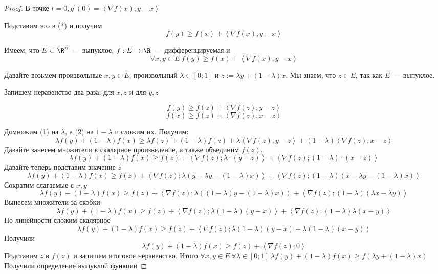 \begin{proof}
  В точке $t=0, g^{\prime}(0) = \left\langle \nabla f(x); y-x \right\rangle$

  Подставим это в (*) и получим
  \[
  f(y) \ge f(x) + \left\langle \nabla f(x); y-x \right\rangle
  \]

  \proofpart{$\Leftarrow$}
  Имеем, что $E \subset \R^n$~--- выпуклое, $f : E \rightarrow \R$~--- дифференцируемая и
  \[
  \forall x, y \in E\ f(y) \ge f(x) + \left\langle \nabla f(x); y-x \right\rangle
  \]

  Давайте возьмем произвольные $x,y \in E$, произвольный $\lambda \in [0;1]$  и $z:= \lambda y + (1-\lambda) x$. Мы знаем, что $z \in E$, так как $E$~--- выпуклое.

  Запишем неравенство два раза: для $x, z$ и  для $y,z$

  \[
  f(y) \ge f(z) + \left\langle \nabla f(z); y - z \right\rangle \tag{1}
  \]
  \[
  f(x) \ge f(z) + \left\langle \nabla f(z); x - z \right\rangle \tag{2}
  \]

  Домножим (1) на $\lambda$, а (2) на $1-\lambda$ и сложим их. Получим:
  \[
  \lambda f(y) + (1-\lambda) f(x) \ge \lambda f(z) + (1-\lambda) f(z) + \lambda \left\langle \nabla f(z); y-z \right\rangle + (1-\lambda) \left\langle  \nabla f(z); x-z \right\rangle
  \]
  Давайте занесем множители в скалярное произведение, а также объединим $f(z)$.
  \[
  \lambda f(y) + (1-\lambda) f(x) \ge f(z)+  \left\langle\nabla f(z);  \lambda \cdot ( y-z ) \right\rangle +\left\langle   \nabla f(z); (1-\lambda) \cdot (  x-z ) \right\rangle
  \]
  Давайте теперь подставим значение $z$
  \[
  \lambda f(y) + (1-\lambda) f(x) \ge  f(z)+  \left\langle \nabla f(z); \lambda (  y - \lambda y - (1-\lambda) x )\right\rangle +\left\langle   \nabla f(z); (1-\lambda) ( x - \lambda y - (1-\lambda) x ) \right\rangle
  \]
  Сократим слагаемые с $x, y$
  \[
  \lambda f(y) + (1-\lambda) f(x) \ge  f(z)+  \left\langle \nabla f(z); \lambda ( (1-\lambda) y - (1-\lambda) x )\right\rangle +\left\langle   \nabla f(z); (1-\lambda) ( \lambda x - \lambda y ) \right\rangle
  \]
  Вынесем множители за скобки
  \[
   \lambda f(y) + (1-\lambda) f(x) \ge  f(z)+  \left\langle \nabla f(z); \lambda (1-\lambda) (  y -  x )\right\rangle +\left\langle   \nabla f(z); (1-\lambda) \lambda ( x -y ) \right\rangle
  \]
  По линейности сложим скалярное
  \[
   \lambda f(y) + (1-\lambda) f(x) \ge  f(z)+  \left\langle \nabla f(z); \lambda (1-\lambda) (  y -  x ) + \lambda (1-\lambda) (x - y)\right\rangle
  \]
  Получили
  \[
   \lambda f(y) + (1-\lambda) f(x) \ge  f(z)+  \left\langle \nabla f(z); 0 \right\rangle
  \]
  Подставим $z$ в $f(z)$ и запишем итоговое неравенство.
  Итого  $\forall x,y \in E\ \forall \lambda \in [0;1]\ \lambda f(y) + (1-\lambda) f(x) \ge f(\lambda y + (1-\lambda) x)$ \\
  Получили определение выпуклой функции
\end{proof}
